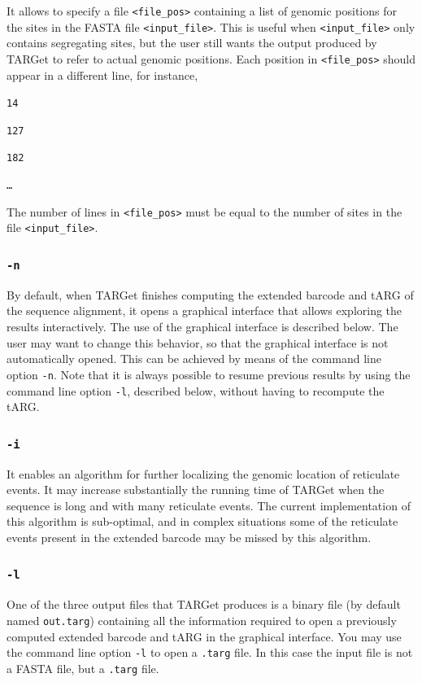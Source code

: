\documentclass[12pt]{article}
\begin{document}
It allows to specify a file \texttt{<file\_pos>} containing a list of genomic positions for the sites in the FASTA file \texttt{<input\_file>}. This is useful when \texttt{<input\_file>} only contains segregating sites, but the user still wants the output produced by TARGet to refer to actual genomic positions. Each position in \texttt{<file\_pos>} should appear in a different line, for instance,

\texttt{14}

\texttt{127}

\texttt{182}

\texttt{\ldots}

\noindent The number of lines in \texttt{<file\_pos>} must be equal to the number of sites in the file \texttt{<input\_file>}.

\subsubsection*{\texttt{-n}}

By default, when TARGet finishes computing the extended barcode and tARG of the sequence alignment, it opens a graphical interface that allows exploring the results interactively. The use of the graphical interface is described below. The user may want to change this behavior, so that the graphical interface is not automatically opened. This can be achieved by means of the command line option \texttt{-n}. Note that it is always possible to resume previous results by using the command line option \texttt{-l}, described below, without having to recompute the tARG.

\subsubsection*{\texttt{-i}}

It enables an algorithm for further localizing the genomic location of reticulate events. It may increase substantially the running time of TARGet when the sequence is long and with many reticulate events. The current implementation of this algorithm is sub-optimal, and in complex situations some of the reticulate events present in the extended barcode may be missed by this algorithm.

\subsubsection*{\texttt{-l}}

One of the three output files that TARGet produces is a binary file (by default named \texttt{out.targ}) containing all the information required to open a previously computed extended barcode and tARG in the graphical interface. You may use the command line option \texttt{-l} to open a \texttt{.targ} file. In this case the input file is not a FASTA file, but a \texttt{.targ} file.
\end{document}
